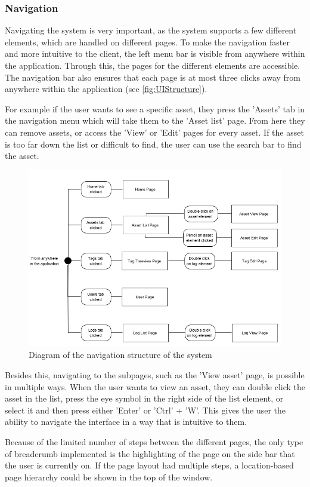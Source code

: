 \subsubsection*{Navigation}
Navigating the system is very important, as the system supports a few different elements, which are handled on different pages. To make the navigation faster and more intuitive to the client, the left menu bar is visible from anywhere within the application. Through this, the pages for the different elements are accessible. The navigation bar also ensures that each page is at most three clicks away from anywhere within the application (see \autoref{fig:UIStructure}).
\par
For example if the user wants to see a specific asset, they press the 'Assets' tab in the navigation menu which will take them to the 'Asset list' page. From here they can remove assets, or access the 'View' or 'Edit' pages for every asset. If the asset is too far down the list or difficult to find, the user can use the search bar to find the asset.

\begin{figure}[H]
    \centering
    \includegraphics[width=1\textwidth]{figures/UIDesignElements/UI_Design_Structure.png}
    \caption{Diagram of the navigation structure of the system}
    \label{fig:UIStructure}
\end{figure}

Besides this, navigating to the subpages, such as the 'View asset' page, is possible in multiple ways. When the user wants to view an asset, they can double click the asset in the list, press the eye symbol in the right side of the list element, or select it and then press either 'Enter' or 'Ctrl' + 'W'. This gives the user the ability to navigate the interface in a way that is intuitive to them.
\par
Because of the limited number of steps between the different pages, the only type of breadcrumb implemented is the highlighting of the page on the side bar that the user is currently on. If the page layout had multiple steps, a location-based page hierarchy \citep{Breadcrumbs} could be shown in the top of the window.

